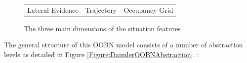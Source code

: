 \begin{figure}
\begin{center}
\begin{tabular}{ccc}
Lateral Evidence & Trajectory & Occupancy Grid \\
\end{tabular}
\caption{\label{Figure:DaimlerSituationFeatures}  The three main dimensions of the situation features \cite{kasper2012object}.}
\end{center}
\end{figure}




The general structure of this OOBN model consists of a number of abstraction levels as detailed in Figure \ref{Figure:DaimlerOOBNAbstraction}. : 

